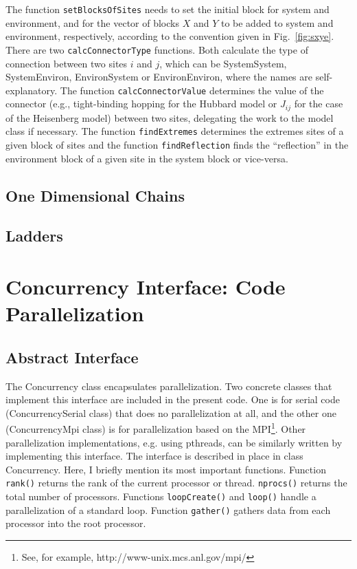 \documentclass[paper=letter]{scrartcl}
\newcommand{\cppClass}[1]{{\sffamily #1}}
\newcommand{\cppFunction}[1]{{\tt #1}}
\begin{document}
The function \cppFunction{setBlocksOfSites}
 needs to set the initial block for system and environment, and for the vector of blocks $X$ and $Y$ to be added
to system and environment, respectively, according to the convention given in Fig.~\ref{fig:sxye}.
There are two \cppFunction{calcConnectorType} functions. Both calculate the type of connection between two sites $i$ and $j$,
which can be SystemSystem, SystemEnviron, 
EnvironSystem or EnvironEnviron, where the names are self-explanatory. The function \cppFunction{calcConnectorValue}
 determines the value of the connector (e.g., tight-binding hopping for the Hubbard model or $J_{ij}$ for the
 case of the Heisenberg model) between two sites, delegating 
the work to the model class if necessary.  The function \cppFunction{findExtremes} determines the 
extremes sites of a given block of sites and 
the function \cppFunction{findReflection} finds the ``reflection'' in the environment block of a given site in the system block or vice-versa.

\subsection{One Dimensional Chains}
\subsection{Ladders}

\section{Concurrency Interface: Code Parallelization} \label{subsec:concurrency}
\subsection{Abstract Interface}
The \cppClass{Concurrency} class encapsulates parallelization. Two concrete classes that implement this interface
are included in the present code. One is for serial code (\cppClass{ConcurrencySerial} class) that does no parallelization at all, and the other one
(\cppClass{ConcurrencyMpi} class)  is for 
parallelization based on the MPI\footnote{See, for example, http://www-unix.mcs.anl.gov/mpi/}. 
Other parallelization implementations, e.g. using pthreads, can be similarly written by implementing this interface.
The interface is described in place in class \cppClass{Concurrency}. 
Here, I briefly mention its most important functions. Function \cppFunction{rank()} returns the rank of the current processor or thread.
\cppFunction{nprocs()} returns the total number of processors. 
Functions \cppFunction{loopCreate()} and \cppFunction{loop()} handle a parallelization of a standard loop.
Function \cppFunction{gather()} gathers data from each processor into the root processor.
\end{document}
